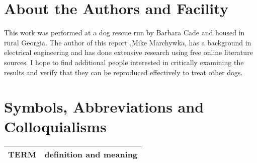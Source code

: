 \documentclass[aps,secnumarabic,balancelastpage,amsmath,amssymb,nofootinbib]{revtex4}
\newlength{\picwidth}  \setlength{\picwidth}{.4\textwidth }
\newcommand{\mjmed}[1]{
[ mjm : #1   ]
}
\begin{document}
\begin{mdpicomment}
\section{About the Authors and Facility}
This work was performed at a dog rescue run by Barbara Cade and
housed in rural Georgia.  The author of this report 
,Mike Marchywka,
has a background in electrical engineering and 
has done extensive research using free online literature sources.  
I hope to find additional people interested in critically 
examining the results and verify that they can be reproduced
effectively to treat other dogs.

\begin{comment}
\begin{figure}[htb] 
\centering
\mjmed{ picture commented out to save space in drafts...  } 
\caption{ 
 }
\end{figure}

\end{comment}


\section{Symbols, Abbreviations and Colloquialisms}

\begin{comment}
\end{comment}


\noindent
\begin{tabular}{@{}ll}
TERM & definition and meaning   \\
\hline
\end{tabular} %



\end{mdpicomment}
\end{document}
